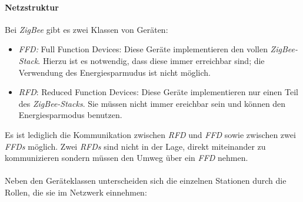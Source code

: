             \paragraph{Netzstruktur}
                Bei \emph{ZigBee} gibt es zwei Klassen von Geräten:

                \begin{itemize}
                    \item{\emph{FFD:}} Full Function Devices: Diese Geräte implementieren
                                den vollen \emph{ZigBee-Stack}. Hierzu ist es notwendig,
                                dass diese immer erreichbar sind; die Verwendung
                                des Energiesparmudus ist nicht möglich.
                    \item{\emph{RFD}:} Reduced Function Devices: Diese Geräte implementieren
                                nur einen Teil des \emph{ZigBee-Stacks}. Sie müssen nicht
                                immer ereichbar sein und können den Energiesparmodus
                                benutzen. 
                \end{itemize}

                Es ist lediglich die Kommunikation zwischen \emph{RFD} und \emph{FFD} sowie zwischen
                zwei \emph{FFDs} möglich. Zwei \emph{RFDs} sind nicht in der Lage, direkt miteinander
                zu kommunizieren sondern müssen den Umweg über ein \emph{FFD} nehmen.\\
                \\
                Neben den Geräteklassen unterscheiden sich die einzelnen Stationen durch
                die Rollen, die sie im Netzwerk einnehmen:

